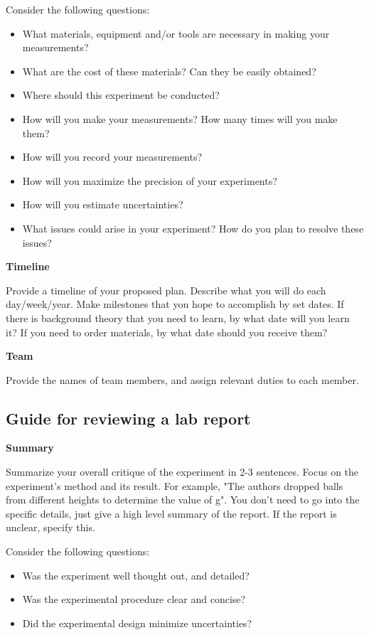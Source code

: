 Consider the following questions:
\begin{itemize}
\item What materials, equipment and/or tools are necessary in making your measurements?
\item What are the cost of these materials? Can they be easily obtained?
\item Where should this experiment be conducted?
\item How will you make your measurements? How many times will you make them?
\item How will you record your measurements?
\item How will you maximize the precision of your experiments?
\item How will you estimate uncertainties?
\item What issues could arise in your experiment? How do you plan to resolve these issues?
\end{itemize}

\textbf{Timeline}

Provide a timeline of your proposed plan. Describe what you will do each day/week/year. Make milestones that you hope to accomplish by set dates. If there is background theory that you need to learn, by what date will you learn it? If you need to order materials, by what date should you receive them?

\textbf{Team}

Provide the names of team members, and assign relevant duties to each member. 

\newpage
\subsection{Guide for reviewing a lab report}
 \vspace{0.25cm}
\textbf{Summary}

Summarize your overall critique of the experiment in 2-3 sentences. Focus on the experiment's method and its result. For example, "The authors dropped balls from different heights to determine the value of g". You don't need to go into the specific details, just give a high level summary of the report. If the report is unclear, specify this.

Consider the following questions:
\begin{itemize}
\item Was the experiment well thought out, and detailed?
\item Was the experimental procedure clear and concise?
\item Did the experimental design minimize uncertainties?
\end{itemize}


